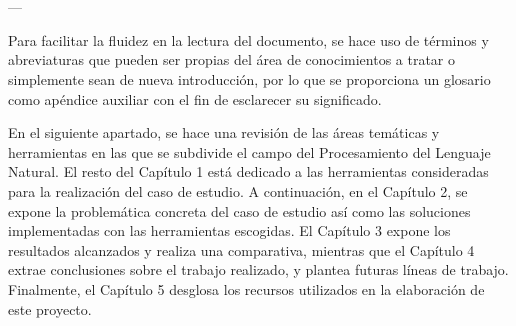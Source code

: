 \chapter{\ChapterOne{}}
\lhead{\emph{\ChapterOne{}}}



---

Para facilitar la fluidez en la lectura del documento, se hace uso de términos y abreviaturas que pueden ser propias del área de conocimientos a tratar o simplemente sean de nueva introducción, por lo que se proporciona un glosario como apéndice auxiliar con el fin de esclarecer su significado.

En el siguiente apartado, se hace una revisión de las áreas temáticas y herramientas en las que se subdivide el campo del Procesamiento del Lenguaje Natural. El resto del Capítulo 1 está dedicado a las herramientas consideradas para la realización del caso de estudio. A continuación, en el Capítulo 2, se expone la problemática concreta del caso de estudio así como las soluciones implementadas con las herramientas escogidas. El Capítulo 3 expone los resultados alcanzados y realiza una comparativa, mientras que el Capítulo 4 extrae conclusiones sobre el trabajo realizado, y plantea futuras líneas de trabajo. Finalmente, el Capítulo 5 desglosa los recursos utilizados en la elaboración de este proyecto.







